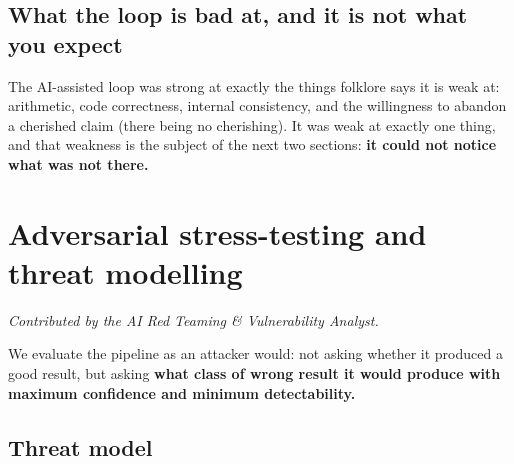 \documentclass[11pt,a4paper]{article}
\begin{document}
\subsection{What the loop is bad at, and it is not what you expect}

The AI-assisted loop was strong at exactly the things folklore says it is weak at:
arithmetic, code correctness, internal consistency, and the willingness to abandon a
cherished claim (there being no cherishing). It was weak at exactly one thing, and that
weakness is the subject of the next two sections: \textbf{it could not notice what was
not there.}

\section{Adversarial stress-testing and threat modelling}
\emph{Contributed by the AI Red Teaming \& Vulnerability Analyst.}

We evaluate the pipeline as an attacker would: not asking whether it produced a good
result, but asking \textbf{what class of wrong result it would produce with maximum
confidence and minimum detectability.}

\subsection{Threat model}
\end{document}
